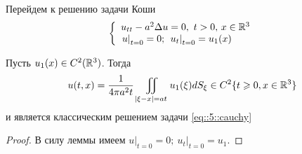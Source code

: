 Перейдем к решению задачи Коши
\begin{equation}
\left\{
  \begin{array}{ll}
  u_{tt}-a^2\Delta u=0,\ t>0,\, x\in \mathbb{R}^3\\
  \left. u\right|_{t=0}=0;\ \left. u_t\right|_{t=0}=u_1(x)
  \end{array}
\right.
\label{eq::5::cauchy}
\end{equation}
\begin{theorem}
Пусть $u_1(x)\in C^2(\mathbb{R}^3)$. Тогда 
\[
u(t,x)=\frac{1}{4\pi a^2t}\iint\limits_{|\xi - x|=at}u_1(\xi )dS_{\xi}\in C^2\{t\geqslant 0, x\in \mathbb{R}^3 \}
\]
и является классическим решением задачи \eqref{eq::5::cauchy}
\end{theorem}
\begin{proof}
В силу леммы имеем $\left. u\right|_{t=0}=0;\ \left. u_t\right|_{t=0}=u_1$.


\end{proof}

